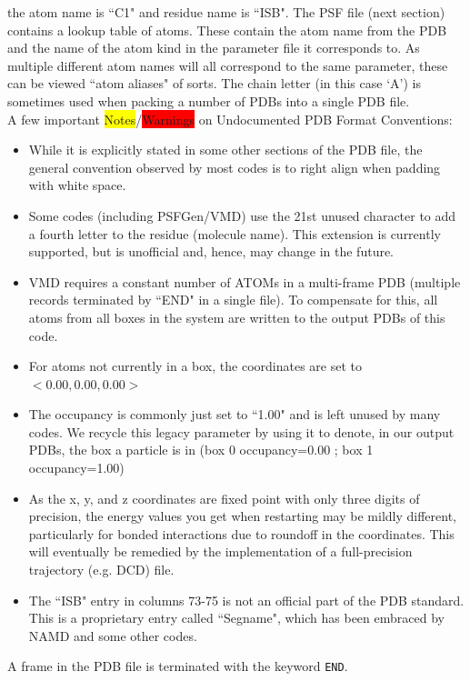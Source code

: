 
the atom name is ``C1" and residue name is ``ISB". The PSF file (next section) contains a lookup table of atoms. These contain the atom name from the PDB and the name of the atom kind in the parameter file it corresponds to. As multiple different atom names will all correspond to the same parameter, these can be viewed ``atom aliases" of sorts.  The chain letter (in this case `A') is sometimes used when packing a number of PDBs into a single PDB file.\\

A few important \colorbox{yellow}{Notes}/\colorbox{red}{Warnings} on Undocumented PDB Format Conventions:
\begin{itemize}
\item While it is explicitly stated in some other sections of the PDB file, the general convention observed by most codes is to right align when padding with white space.
\item Some codes (including PSFGen/VMD) use the 21st unused character to add a fourth letter to the residue (molecule name). This extension is currently supported, but is unofficial and, hence, may change in the future.
\item VMD requires a constant number of ATOMs in a multi-frame PDB (multiple records terminated by ``END" in a single file). To compensate for this, all atoms from all boxes in the system are written to the output PDBs of this code.
\item For atoms not currently in a box, the coordinates are set to $<0.00, 0.00, 0.00>$
\item The occupancy is commonly just set to ``1.00" and is left unused by many codes. We recycle this legacy parameter by using it to denote, in our output PDBs, the box a particle is in (box 0  occupancy=0.00 ; box 1  occupancy=1.00)
\item As the x, y, and z coordinates are fixed point with only three digits of precision, the energy values you get when restarting may be mildly different, particularly for bonded interactions due to roundoff in the coordinates.  This will eventually be remedied by the implementation of a full-precision trajectory (e.g. DCD) file.
\item The ``ISB" entry in columns 73-75 is not an official part of the PDB standard.  This is a proprietary entry called ``Segname", which has been embraced by NAMD and some other codes.
\end{itemize}
A frame in the PDB file is terminated with the keyword \texttt{END}.\\
